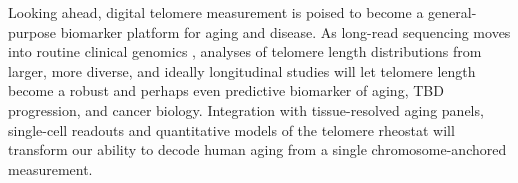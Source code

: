 \documentclass[11pt]{article}
\begin{document}
Looking ahead, digital telomere measurement is poised to become a
general-purpose biomarker platform for aging and disease. As long-read
sequencing moves into routine clinical genomics
\citep{nurk2022complete}, analyses of telomere length distributions
from larger, more diverse, and ideally longitudinal studies will let
telomere length become a robust and perhaps even predictive biomarker
of aging, TBD progression, and cancer biology. Integration with
tissue-resolved aging panels, single-cell readouts and quantitative
models of the telomere rheostat will transform our ability to decode
human aging from a single chromosome-anchored measurement.



\end{document}

